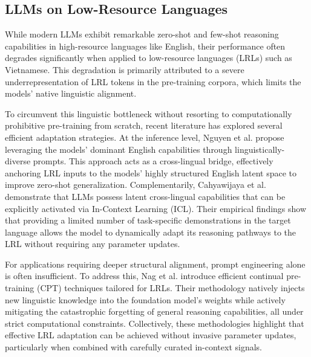 \documentclass[10pt,conference]{IEEEtran}
\begin{document}
\subsection{LLMs on Low-Resource Languages}
While modern LLMs exhibit remarkable zero-shot and few-shot reasoning capabilities in high-resource languages like English, their performance often degrades significantly when applied to low-resource languages (LRLs) such as Vietnamese. This degradation is primarily attributed to a severe underrepresentation of LRL tokens in the pre-training corpora, which limits the models' native linguistic alignment. 

To circumvent this linguistic bottleneck without resorting to computationally prohibitive pre-training from scratch, recent literature has explored several efficient adaptation strategies. At the inference level, Nguyen et al. \cite{democratizing2024acl} propose leveraging the models' dominant English capabilities through linguistically-diverse prompts. This approach acts as a cross-lingual bridge, effectively anchoring LRL inputs to the models' highly structured English latent space to improve zero-shot generalization. Complementarily, Cahyawijaya et al. \cite{cahyawijaya2024llms} demonstrate that LLMs possess latent cross-lingual capabilities that can be explicitly activated via In-Context Learning (ICL). Their empirical findings show that providing a limited number of task-specific demonstrations in the target language allows the model to dynamically adapt its reasoning pathways to the LRL without requiring any parameter updates. 

For applications requiring deeper structural alignment, prompt engineering alone is often insufficient. To address this, Nag et al. \cite{efficientcpt2025naacl} introduce efficient continual pre-training (CPT) techniques tailored for LRLs. Their methodology natively injects new linguistic knowledge into the foundation model's weights while actively mitigating the catastrophic forgetting of general reasoning capabilities, all under strict computational constraints. Collectively, these methodologies highlight that effective LRL 
adaptation can be achieved without invasive parameter updates, 
particularly when combined with carefully curated in-context signals.
\end{document}
